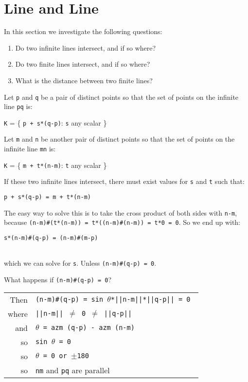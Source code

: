 \documentclass[12pt]{article}
\begin{document}
\newpage


\section{Line and Line}
In this section we investigate the following questions:
\begin{enumerate}
\item Do two infinite lines intersect, and if so where?
\item Do two finite lines intersect, and if so where?
\item What is the distance between two finite lines?
\end{enumerate}

Let {\tt p} and {\tt q} be a pair of distinct points so that the set
of points on the infinite line {\tt pq} is: \\
\centerline{{\tt K} = \{ {\tt p + s*(q-p)}: {\tt s} any scalar \}} 

Let {\tt m} and {\tt n} be another pair of distinct points so that the set
of points on the infinite line {\tt mn} is: \\
\centerline{{\tt K} = \{ {\tt m + t*(n-m)}: {\tt t} any scalar \}} 

If these two infinite lines intersect, there must exist values for
{\tt s} and {\tt t} such that: \\
\centerline{{\tt p + s*(q-p) = m + t*(n-m)}}

The easy way to solve this is to take the cross product of both
sides with {\tt n-m}, because
{\tt (n-m)\#(t*(n-m)) = t*((n-m)\#(n-m)) = t*0 = 0}.
So we end up with: \\
\centerline{\tt s*(n-m)\#(q-p) = (n-m)\#(m-p)} \\
which we can solve for {\tt s}.  Unless {\tt (n-m)\#(q-p) = 0}.

What happens if {\tt (n-m)\#(q-p) = 0}? \\
\hspace*{0.3in}\begin{tabular}{r@{~~}l}
Then    & \tt (n-m)\#(q-p) = sin $\theta$*||n-m||*||q-p|| = 0 \\
where   & \tt ||n-m|| $\neq$ 0 $\neq$ ||q-p|| \\
and     & \tt $\theta$ = azm (q-p) - azm (n-m) \\
so      & \tt sin $\theta$ = 0 \\
so      & \tt $\theta$ = 0 or $\pm$180 \\
so      & {\tt nm} and {\tt pq} are parallel \\
        \end{tabular}
\end{document}
